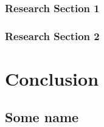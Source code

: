 	\subsection*{Research Section 1}
	\lipsum[1-3]
	\subsection*{Research Section 2}
	\lipsum[1-3]
\chapter{Conclusion}
\lipsum[1-3]

\clearpage
\renewcommand{\bibname}{References} %
\printbibliography[heading=bibintoc] %

\begin{appendices}
	\chapter{Some name}
	\lipsum[3]
\end{appendices}

